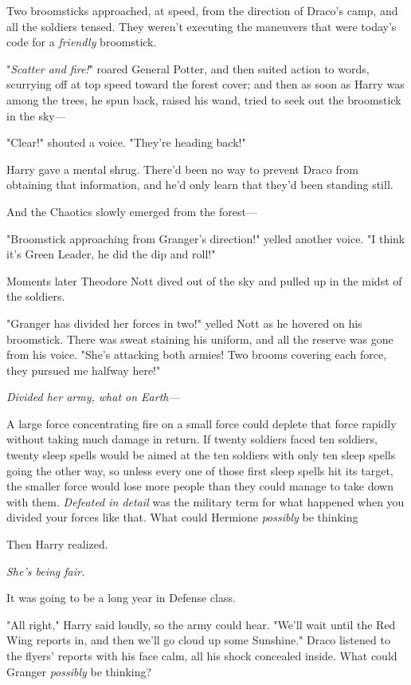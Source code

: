 Two broomsticks approached, at speed, from the direction of Draco's camp, and
all the soldiers tensed. They weren't executing the maneuvers that were today's
code for a \emph{friendly} broomstick.

"\emph{Scatter and fire!}" roared General Potter, and then suited action to
words, scurrying off at top speed toward the forest cover; and then as soon as
Harry was among the trees, he spun back, raised his wand, tried to seek out the
broomstick in the sky---

"Clear!" shouted a voice. "They're heading back!"

Harry gave a mental shrug. There'd been no way to prevent Draco from obtaining
that information, and he'd only learn that they'd been standing still.

And the Chaotics slowly emerged from the forest---

"Broomstick approaching from Granger's direction!" yelled another voice. "I
think it's Green Leader, he did the dip and roll!"

Moments later Theodore Nott dived out of the sky and pulled up in the midst of
the soldiers.

"Granger has divided her forces in two!" yelled Nott as he hovered on his
broomstick. There was sweat staining his uniform, and all the reserve was gone
from his voice. "She's attacking both armies! Two brooms covering each force,
they pursued me halfway here!"

\emph{Divided her army, what on Earth---}

A large force concentrating fire on a small force could deplete that force
rapidly without taking much damage in return. If twenty soldiers faced ten
soldiers, twenty sleep spells would be aimed at the ten soldiers with only ten
sleep spells going the other way, so unless every one of those first sleep
spells hit its target, the smaller force would lose more people than they could
manage to take down with them. \emph{Defeated in detail} was the military term
for what happened when you divided your forces like that. What could Hermione
\emph{possibly} be thinking{\el}

Then Harry realized.

\emph{She's being fair.}

It was going to be a long year in Defense class.

"All right," Harry said loudly, so the army could hear. "We'll wait until the
Red Wing reports in, and then we'll go cloud up some Sunshine."
\sbreak
Draco listened to the flyers' reports with his face calm, all his shock
concealed inside. What could Granger \emph{possibly} be thinking?

